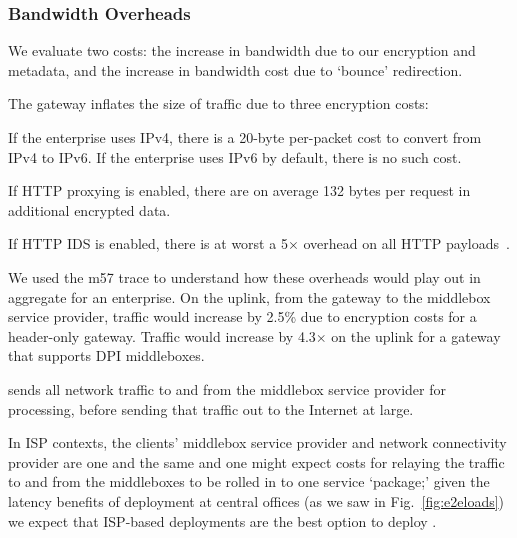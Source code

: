 \subsubsection{Bandwidth Overheads}
We evaluate two costs: the increase in bandwidth due to our encryption and metadata, and the increase in bandwidth cost due to `bounce' redirection.

The gateway inflates the size of traffic due to three encryption costs:
\begin{myitemize}
  \item If the enterprise uses IPv4, there is a 20-byte per-packet cost to convert from IPv4 to IPv6. If the enterprise uses IPv6 by default, there is no such cost.
  \item If HTTP proxying is enabled, there are on average 132 bytes per request in additional encrypted data.
  \item If HTTP IDS is enabled, there is at worst a 5$\times$ overhead on all HTTP payloads~\cite{blindbox}.
\end{myitemize}
We used the m57 trace to understand how these overheads would play out in aggregate for an enterprise.
On the uplink, from the gateway to the middlebox service provider, traffic would increase by 2.5\% due to encryption costs for a header-only gateway. Traffic would increase by 4.3$\times$ on the uplink for a gateway that supports DPI middleboxes. 

\sys sends all network traffic to and from the middlebox service provider for processing, before sending that traffic out to the Internet at large. 

In ISP contexts, the clients' middlebox service provider and network connectivity provider are one and the same and one might expect costs for relaying the traffic to and from the middleboxes to be rolled in to one service `package;' given the latency benefits of deployment at central offices (as we saw in Fig.~\ref{fig:e2eloads}) we expect that ISP-based deployments are the best option to deploy \sys.

